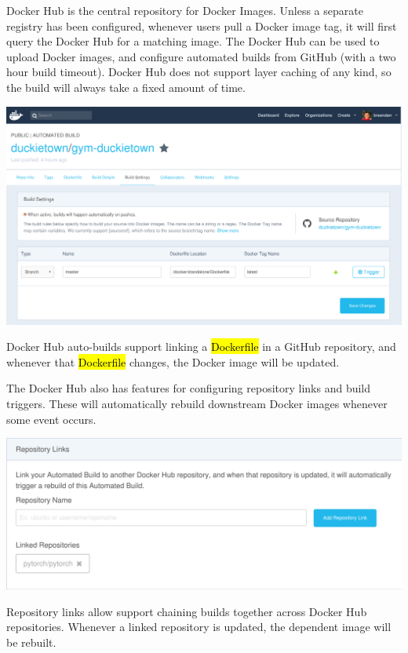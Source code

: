 \documentclass[12pt,initial,twoside,maitrise]{dms}
\newcommand{\inline}[1]{%
    \begingroup%
    \sethlcolor{slightgray}%
    \hl{\ttfamily\footnotesize #1}%
    \endgroup
}
\numberwithin{equation}{section}
\numberwithin{table}{chapter}
\numberwithin{figure}{chapter}
\begin{document}
Docker Hub is the central repository for Docker Images. Unless a separate registry has been configured, whenever users pull a Docker image tag, it will first query the Docker Hub for a matching image. The Docker Hub can be used to upload Docker images, and configure automated builds from GitHub (with a two hour build timeout). Docker Hub does not support layer caching of any kind, so the build will always take a fixed amount of time.\vspace{10pt}
%
\begin{centering}
\includegraphics[width=\textwidth]{../figures/docker_hub_autobuild.png}
\end{centering}
%
Docker Hub auto-builds support linking a \inline{Dockerfile} in a GitHub repository, and whenever that \inline{Dockerfile} changes, the Docker image will be updated.

The Docker Hub also has features for configuring repository links and build triggers. These will automatically rebuild downstream Docker images whenever some event occurs.\vspace{10pt}
%
\begin{centering}
\includegraphics[width=\textwidth]{../figures/docker_hub_repo_links.png}
\end{centering}
%
Repository links allow support chaining builds together across Docker Hub repositories. Whenever a linked repository is updated, the dependent image will be rebuilt.
\end{document}
